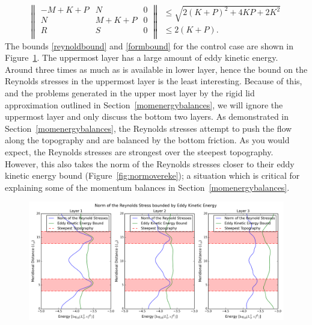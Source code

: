\documentclass[12pt,a4paper]{report}
\newcommand*\figref[1]{Figure~\ref{#1}}
\newcommand*\secref[1]{Section~\ref{#1}}
\begin{document}
\begin{equation}
{\left\|\begin{array}{ccc}
	-M + K + P & N & 0 \\
	N & M + K + P & 0\\
	R & S & 0\\
	\end{array}\right\| 
	\begin{array}{c}
	\leq \sqrt{2(K + P)^{2}+4KP+2K^{2}} \\
	\leq 2(K+P).\\
	\end{array}}
\end{equation} 
The bounds \eqref{reynoldbound} and \eqref{formbound} for the control case
are shown in \figref{fig:ekebound}.
The uppermost layer has a large amount of eddy kinetic energy. Around three
times as much as is available in lower layer, hence the bound on the Reynolds stresses in
the uppermost layer is the least interesting. 
Because of this, and the problems generated in the
upper most layer by the rigid lid approximation outlined in \secref{momenergybalances}, 
we will ignore the uppermost layer and only discuss the bottom two layers. 
As demonstrated in \secref{momenergybalances}, the Reynolds stresses attempt to 
push the flow along the topography and are balanced by the bottom friction.
As you would expect, the Reynolds stresses are strongest over the steepest topography.
However, this also takes the norm of the Reynolds stresses closer to their
eddy kinetic energy bound (\figref{fig:normovereke}); a situation which is critical for explaining some of the 
momentum balances in \secref{momenergybalances}.


\begin{figure}
	\centering
	\includegraphics[width=\linewidth]{ekebound}
	\caption{ }
	\label{fig:ekebound}
\end{figure}
\end{document}

